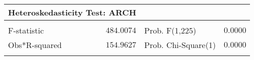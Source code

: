\begin{tabular}{lrrrr}
\toprule
\multicolumn{2}{l}{Heteroskedasticity Test: ARCH}&\multicolumn{1}{c}{}&\multicolumn{1}{c}{}&\multicolumn{1}{c}{}\\
[4.5pt] \hline \\ [-4.5pt]
\multicolumn{1}{l}{F-statistic}&\multicolumn{1}{r}{$484.0074$}&\multicolumn{2}{l}{Prob. F(1,225)}&\multicolumn{1}{r}{$0.0000$}\\
\multicolumn{1}{l}{Obs*R-squared}&\multicolumn{1}{r}{$154.9627$}&\multicolumn{2}{l}{Prob. Chi-Square(1)}&\multicolumn{1}{r}{$0.0000$}\\
[4.5pt] \bottomrule \\ 
\end{tabular}
